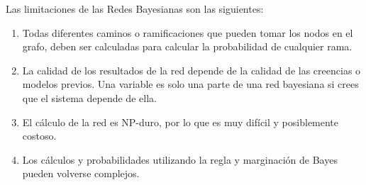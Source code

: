 Las limitaciones de las Redes Bayesianas son las siguientes:

\begin{enumerate} 
    \item Todas diferentes caminos o ramificaciones que pueden tomar los nodos en el grafo, deben ser calculadas para calcular la probabilidad de cualquier rama.
    \item La calidad de los resultados de la red depende de la calidad de las creencias o modelos previos. Una variable es solo una parte de una red bayesiana si crees que el sistema depende de ella.
    \item El cálculo de la red es NP-duro, por lo que es muy difícil y posiblemente costoso.
    \item Los cálculos y probabilidades utilizando la regla y marginación de Bayes pueden volverse complejos.
\end{enumerate}